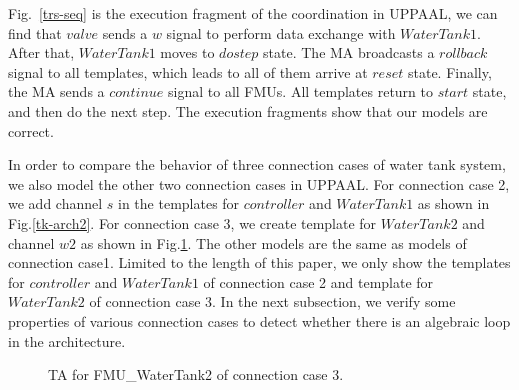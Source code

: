 Fig.~\ref{trs-seq} is the execution fragment of the coordination in UPPAAL, we can find that $valve$ sends a $w$ signal to perform data exchange with $WaterTank1$. After that, $WaterTank1$ moves to $dostep$ state. The MA broadcasts a $rollback$ signal to all templates, which leads to all of them arrive at $reset$ state. Finally, the MA sends a $continue$ signal to all FMUs. All templates return to $start$ state, and then do the next step. The execution fragments show that our models are correct.

In order to compare the behavior of three connection cases of water tank system, we also model the other two connection cases in UPPAAL. For connection case 2, we add channel $s$ in the templates for $controller$ and $WaterTank1$ as shown in Fig.\ref{tk-arch2}. For connection case 3, we create template for $WaterTank2$ and channel $w2$ as shown in Fig.\ref{arc3}. The other models are the same as models of connection case1. Limited to the length of this paper, we only show the templates for $controller$ and $WaterTank1$ of connection case 2 and template for $WaterTank2$ of connection case 3. In the next subsection, we verify some properties of various connection cases to detect whether there is an algebraic loop in the architecture.
\begin{figure}[htbp]
\end{figure}
\begin{figure}[htbp]
	\caption{TA for FMU\_WaterTank2 of connection case 3.}\label{arc3}
\end{figure}

